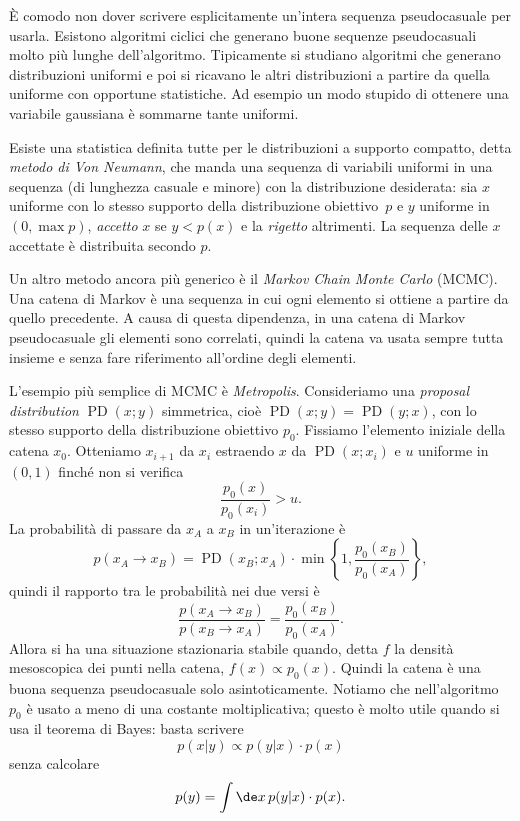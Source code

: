 È comodo non dover scrivere esplicitamente un'intera sequenza pseudocasuale per usarla.
Esistono algoritmi ciclici che generano buone sequenze pseudocasuali molto più lunghe dell'algoritmo.
Tipicamente si studiano algoritmi che generano distribuzioni uniformi e poi si ricavano le altri distribuzioni a partire da quella uniforme con opportune statistiche.
Ad esempio un modo stupido di ottenere una variabile gaussiana è sommarne tante uniformi.

Esiste una statistica definita tutte per le distribuzioni a supporto compatto,
detta \emph{metodo di Von Neumann},
che manda una sequenza di variabili uniformi in una sequenza (di lunghezza casuale e minore) con la distribuzione desiderata:
sia $x$ uniforme con lo stesso supporto della distribuzione obiettivo~$p$
e $y$ uniforme in $(0,\max p)$, \emph{accetto} $x$ se $y<p(x)$ e la \emph{rigetto} altrimenti.
La sequenza delle $x$ accettate è distribuita secondo $p$.

Un altro metodo ancora più generico è il \emph{Markov Chain Monte Carlo} (MCMC).
Una catena di Markov è una sequenza in cui ogni elemento si ottiene a partire da quello precedente.
A causa di questa dipendenza,
in una catena di Markov pseudocasuale gli elementi sono correlati,
quindi la catena va usata sempre tutta insieme e senza fare riferimento all'ordine degli elementi.

L'esempio più semplice di MCMC è \emph{Metropolis}.
Consideriamo una \emph{proposal distribution} $\operatorname{PD}(x;y)$ simmetrica,
cioè $\operatorname{PD}(x;y) = \operatorname{PD}(y;x)$,
con lo stesso supporto della distribuzione obiettivo $p_0$.
Fissiamo l'elemento iniziale della catena $x_0$.
Otteniamo $x_{i+1}$ da $x_i$ estraendo $x$ da $\operatorname{PD}(x;x_i)$ e $u$ uniforme in $(0,1)$ finché non si verifica
\begin{equation*}
	\frac{p_0(x)}{p_0(x_i)} > u.
\end{equation*}
La probabilità di passare da $x_A$ a $x_B$ in un'iterazione è
\begin{equation*}
	p(x_A\rightarrow x_B)
	= \operatorname{PD}(x_B;x_A) \cdot \min\left\{1,\frac{p_0(x_B)}{p_0(x_A)}\right\},
\end{equation*}
quindi il rapporto tra le probabilità nei due versi è
\begin{equation*}
	\frac {p(x_A\rightarrow x_B)} {p(x_B\rightarrow x_A)}
	= \frac{p_0(x_B)}{p_0(x_A)}.
\end{equation*}
Allora si ha una situazione stazionaria stabile quando,
detta $f$ la densità mesoscopica dei punti nella catena,
$f(x)\propto p_0(x)$.
Quindi la catena è una buona sequenza pseudocasuale solo asintoticamente.
Notiamo che nell'algoritmo $p_0$ è usato a meno di una costante moltiplicativa;
questo è molto utile quando si usa il teorema di Bayes: basta scrivere
\begin{equation*}
	p(x|y) \propto p(y|x) \cdot p(x)
\end{equation*}
senza calcolare
\begin{equation*}
	p(y) = \int \de x\, p(y|x)\cdot p(x).
\end{equation*}

